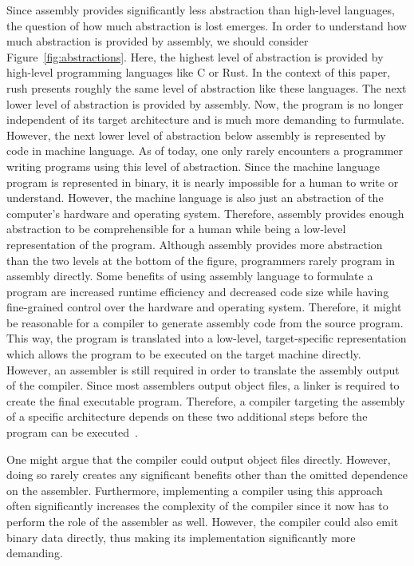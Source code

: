 Since assembly provides significantly less abstraction than high-level languages, the question of how much abstraction is lost emerges.
In order to understand how much abstraction is provided by assembly, we should consider Figure~\ref{fig:abstractions}.
Here, the highest level of abstraction is provided by high-level programming languages like C or Rust.
In the context of this paper, rush presents roughly the same level of abstraction like these languages.
The next lower level of abstraction is provided by assembly.
Now, the program is no longer independent of its target architecture and is much more demanding to furmulate.
However, the next lower level of abstraction below assembly is represented by code in machine language.
As of today, one only rarely encounters a programmer writing programs using this level of abstraction.
Since the machine language program is represented in binary, it is nearly impossible for a human to write or understand.
However, the machine language is also just an abstraction of the computer's hardware and operating system.
Therefore, assembly provides enough abstraction to be comprehensible for a human while being a low-level representation of the program.
Although assembly provides more abstraction than the two levels at the bottom of the figure, programmers rarely program in assembly directly.
Some benefits of using assembly language to formulate a program are increased runtime efficiency and decreased code size while having fine-grained control over the hardware and operating system.
Therefore, it might be reasonable for a compiler to generate assembly code from the source program.
This way, the program is translated into a low-level, target-specific representation which allows the program to be executed on the target machine directly.
However, an assembler is still required in order to translate the assembly output of the compiler.
Since most assemblers output object files, a linker is required to create the final executable program.
Therefore, a compiler targeting the assembly of a specific architecture depends on these two additional steps before the program can be executed~\cite[p.~5-6]{Dandamudi2005}.

One might argue that the compiler could output object files directly.
However, doing so rarely creates any significant benefits other than the omitted dependence on the assembler.
Furthermore, implementing a compiler using this approach often significantly increases the complexity of the compiler since it now has to perform the role of the assembler as well.
However, the compiler could also emit binary data directly, thus making its implementation significantly more demanding.

